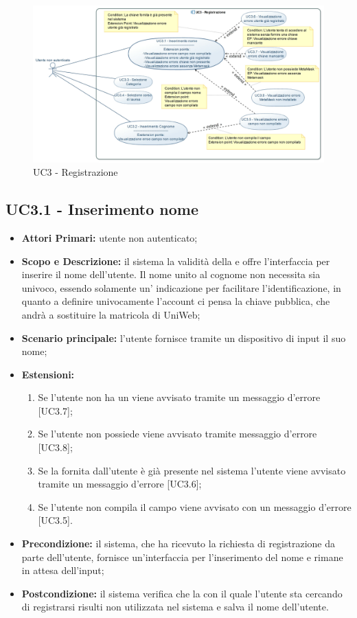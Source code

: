 \documentclass[AnalisiDeiRequisiti.tex]{subfiles}
\begin{document}
\begin{figure}[H]
	\centering
	\includegraphics[width=1.0\linewidth]{UC3.jpg}
	\caption{UC3 - Registrazione}
	\label{fig:UC3 - Registrazione}
\end{figure}


\subsection{UC3.1 - Inserimento nome}
\begin{itemize}
	\item \textbf{Attori Primari:} utente non autenticato;
	\item \textbf{Scopo e Descrizione:} il sistema  la validità della  e offre l'interfaccia per inserire il nome dell'utente. Il nome unito al cognome non necessita sia univoco, essendo solamente un' indicazione per facilitare l'identificazione, in quanto a definire univocamente l'account ci pensa la chiave pubblica, che andrà a sostituire la matricola di UniWeb;
	\item \textbf{Scenario principale:} l'utente fornisce tramite un dispositivo di input il suo nome;
	\item \textbf{Estensioni:}
		\begin{enumerate}
			\item Se l'utente non ha un  viene avvisato tramite un messaggio d'errore [UC3.7];
			\item Se l'utente non possiede  viene avvisato tramite messaggio d'errore [UC3.8];
			\item Se la  fornita dall'utente è già presente nel sistema l'utente viene avvisato tramite un messaggio d'errore [UC3.6];
			\item Se l'utente non compila il campo viene avvisato con un messaggio d'errore [UC3.5].
		\end{enumerate}
	\item \textbf{Precondizione:} il sistema, che ha ricevuto la richiesta di registrazione da parte dell'utente, fornisce un'interfaccia per l'inserimento del nome e rimane in attesa dell'input;
	\item \textbf{Postcondizione:} il sistema verifica che la  con il quale l'utente sta cercando di registrarsi risulti non utilizzata nel sistema e salva il nome dell'utente.
\end{itemize}	
\end{document}
